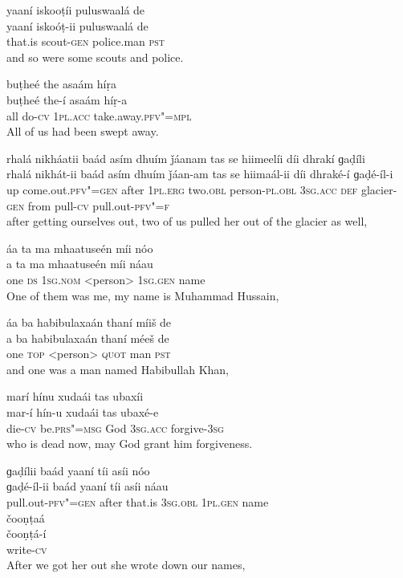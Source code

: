 \begin{exe}
\ex
\label{ex:19}
\glll yaaní	iskooṭíi	puluswaalá	de \\
yaaní	iskoóṭ-ii	puluswaalá	de \\
that.is	scout-\textsc{gen}	police.man \textsc{pst} \\
\glt and so were some scouts and police.

\ex
\label{ex:20}
\glll buṭheé	the	asaám	híṛa \\
buṭheé	the-í	asaám	híṛ-a \\
all	do-\textsc{cv}	\textsc{1pl.acc}	take.away.\textsc{pfv"=mpl} \\
\glt All of us had been swept away.

\ex
\label{ex:21}
\glll rhalá	nikháatii	baád	asím	dhuím	ǰáanam  tas	se	hiimeelíi	díi	dhrakí	ɡaḍíli\\
rhalá	nikhát-ii	baád	asím	dhuím	ǰáan-am tas	se	hiimaál-ii	díi	dhraké-í	ɡaḍé-íl-i\\
up	come.out.\textsc{pfv"=gen}	after	\textsc{1pl.erg}	two.\textsc{obl}	person-\textsc{pl.obl} \textsc{3sg.acc} \textsc{def}	glacier-\textsc{gen}	from	pull-\textsc{cv}	pull.out-\textsc{pfv"=f}\\
\glt after getting ourselves out, two of us pulled her out of the glacier as well,

\ex
\label{ex:22}
\glll áa	ta	ma	mhaatuseén	míi	nóo \\
a	ta	ma	mhaatuseén	míi	náau \\
one	\textsc{ds} \textsc{1sg.nom}	<person> \textsc{1sg.gen}	name \\
\glt One of them was me, my name is Muhammad Hussain,

\ex
\label{ex:23}
\glll áa	ba	habibulaxaán	thaní	míiš	de \\
a	ba	habibulaxaán	thaní	méeš	de \\
one \textsc{top}	<person>	\textsc{quot}	man	\textsc{pst} \\
\glt and one was a man named Habibullah Khan,

\ex
\label{ex:24}
\glll marí	hínu	xudaái	tas	ubaxíi \\
mar-í	hín-u	xudaái	tas	ubaxé-e \\
die-\textsc{cv}	be.\textsc{prs"=msg}	God	\textsc{3sg.acc}	forgive-\textsc{3sg} \\
\glt who is dead now, may God grant him forgiveness.

\ex
\label{ex:25}
\glll ɡaḍílii	baád	yaaní	tíi	asíi	nóo \\
ɡaḍé-íl-ii	baád	yaaní	tíi	asíi	náau \\
pull.out-\textsc{pfv"=gen}	after	that.is	\textsc{3sg.obl}	\textsc{1pl.gen}	name \\
\glll čooṇṭaá \\
čooṇṭá-í \\
write-\textsc{cv} \\
\glt After we got her out she wrote down our names,


\end{exe}
